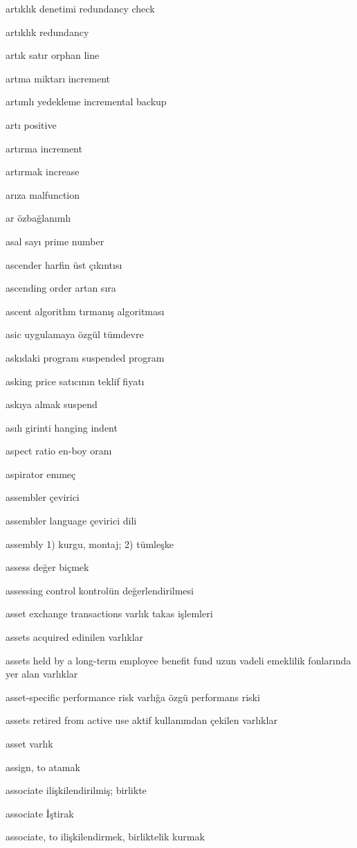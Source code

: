 \documentclass[12pt,fleqn]{article}\usepackage{../../common}
\begin{document}
artıklık denetimi redundancy check

artıklık redundancy

artık satır orphan line

artma miktarı increment

artımlı yedekleme incremental backup

artı positive

artırma increment

artırmak increase

arıza malfunction

ar özbağlanımlı

asal sayı prime number

ascender harfin üst çıkıntısı

ascending order artan sıra

ascent algorithm tırmanış algoritması

asic uygulamaya özgül tümdevre

askıdaki program suspended program

asking price satıcının teklif fiyatı

askıya almak suspend

asılı girinti hanging indent

aspect ratio en-boy oranı

aspirator emmeç

assembler çevirici

assembler language çevirici dili

assembly 1) kurgu, montaj; 2) tümleşke

assess değer biçmek

assessing control kontrolün değerlendirilmesi

asset exchange transactions varlık takas işlemleri

assets acquired edinilen varlıklar

assets held by a long-term employee benefit fund uzun vadeli emeklilik fonlarında yer alan varlıklar

asset-specific performance risk varlığa özgü performans riski

assets retired from active use aktif kullanımdan çekilen varlıklar

asset varlık

assign, to atamak

associate ilişkilendirilmiş; birlikte

associate İştirak

associate, to ilişkilendirmek, birliktelik kurmak
\end{document}
